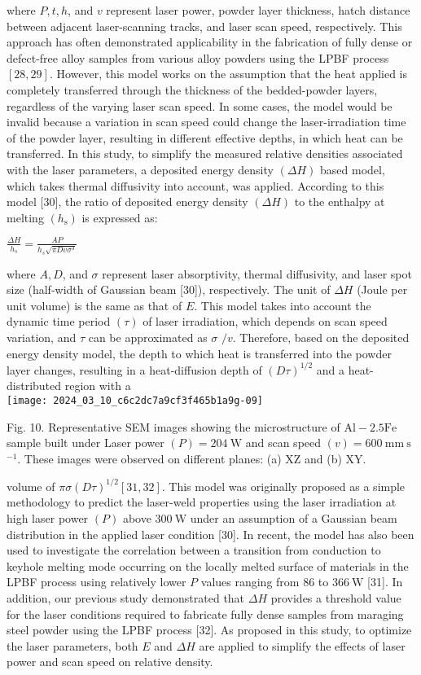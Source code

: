 \documentclass[10pt]{article}
\begin{document}
where $P, t, h$, and $v$ represent laser power, powder layer thickness, hatch distance between adjacent laser-scanning tracks, and laser scan speed, respectively. This approach has often demonstrated applicability in the fabrication of fully dense or defect-free alloy samples from various alloy powders using the LPBF process $[28,29]$. However, this model works on the assumption that the heat applied is completely transferred through the thickness of the bedded-powder layers, regardless of the varying laser scan speed. In some cases, the model would be invalid because a variation in scan speed could change the laser-irradiation time of the powder layer, resulting in different effective depths, in which heat can be transferred. In this study, to simplify the measured relative densities associated with the laser parameters, a deposited energy density $(\Delta H)$ based model, which takes thermal diffusivity into account, was applied. According to this model [30], the ratio of deposited energy density $(\Delta H)$ to the enthalpy at melting $\left(h_{\mathrm{s}}\right)$ is expressed as:

$\frac{\Delta H}{h_{s}}=\frac{A P}{h_{s} \sqrt{\pi D v \sigma^{3}}}$

where $A, D$, and $\sigma$ represent laser absorptivity, thermal diffusivity, and laser spot size (half-width of Gaussian beam [30]), respectively. The unit of $\Delta H$ (Joule per unit volume) is the same as that of $E$. This model takes into account the dynamic time period $(\tau)$ of laser irradiation, which depends on scan speed variation, and $\tau$ can be approximated as $\sigma$ $/ v$. Therefore, based on the deposited energy density model, the depth to which heat is transferred into the powder layer changes, resulting in a heat-diffusion depth of $(D \tau)^{1 / 2}$ and a heat-distributed region with a\\
\texttt{[image: 2024\_03\_10\_c6c2dc7a9cf3f465b1a9g-09]}

Fig. 10. Representative SEM images showing the microstructure of $\mathrm{Al}-2.5 \mathrm{Fe}$ sample built under Laser power $(P)=204 \mathrm{~W}$ and scan speed $(v)=600 \mathrm{~mm} \mathrm{~s}$ ${ }^{-1}$. These images were observed on different planes: (a) XZ and (b) XY.

volume of $\pi \sigma(D \tau)^{1 / 2}[31,32]$. This model was originally proposed as a simple methodology to predict the laser-weld properties using the laser irradiation at high laser power $(P)$ above $300 \mathrm{~W}$ under an assumption of a Gaussian beam distribution in the applied laser condition [30]. In recent, the model has also been used to investigate the correlation between a transition from conduction to keyhole melting mode occurring on the locally melted surface of materials in the LPBF process using relatively lower $P$ values ranging from 86 to $366 \mathrm{~W}$ [31]. In addition, our previous study demonstrated that $\Delta H$ provides a threshold value for the laser conditions required to fabricate fully dense samples from maraging steel powder using the LPBF process [32]. As proposed in this study, to optimize the laser parameters, both $E$ and $\Delta H$ are applied to simplify the effects of laser power and scan speed on relative density.
\end{document}
